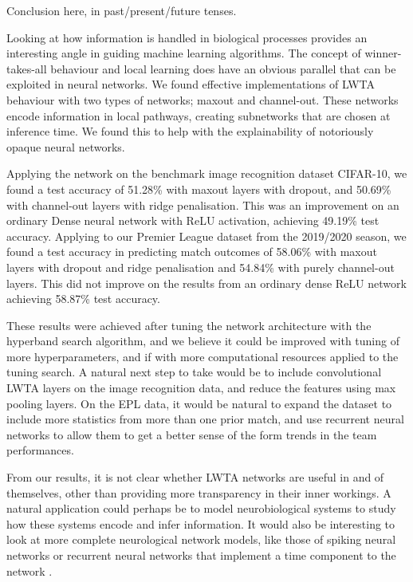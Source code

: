 Conclusion here, in past/present/future tenses.

Looking at how information is handled in biological processes provides an interesting angle in guiding machine learning algorithms. The concept of winner-takes-all behaviour and local learning does have an obvious parallel that can be exploited in neural networks. We found effective implementations of LWTA behaviour with two types of networks; maxout and channel-out. These networks encode information in local pathways, creating subnetworks that are chosen at inference time. We found this to help with the explainability of notoriously opaque neural networks.

Applying the network on the benchmark image recognition dataset CIFAR-10, we found a test accuracy of 51.28\% with maxout layers with dropout, and 50.69\% with channel-out layers with ridge penalisation. This was an improvement on an ordinary Dense neural network with ReLU activation, achieving 49.19\% test accuracy. Applying to our Premier League dataset from the 2019/2020 season, we found a test accuracy in predicting match outcomes of 58.06\% with maxout layers with dropout and ridge penalisation and 54.84\% with purely channel-out layers. This did not improve on the results from an ordinary dense ReLU network achieving 58.87\% test accuracy.

These results were achieved after tuning the network architecture with the hyperband search algorithm, and we believe it could be improved with tuning of more hyperparameters, and if with more computational resources applied to the tuning search. A natural next step to take would be to include convolutional LWTA layers on the image recognition data, and reduce the features using max pooling layers. On the EPL data, it would be natural to expand the dataset to include more statistics from more than one prior match, and use recurrent neural networks to allow them to get a better sense of the form trends in the team performances.

From our results, it is not clear whether LWTA networks are useful in and of themselves, other than providing more transparency in their inner workings. A natural application could perhaps be to model neurobiological systems to study how these systems encode and infer information. It would also be interesting to look at more complete neurological network models, like those of spiking neural networks or recurrent neural networks that implement a time component to the network \citep{Chen}. 

